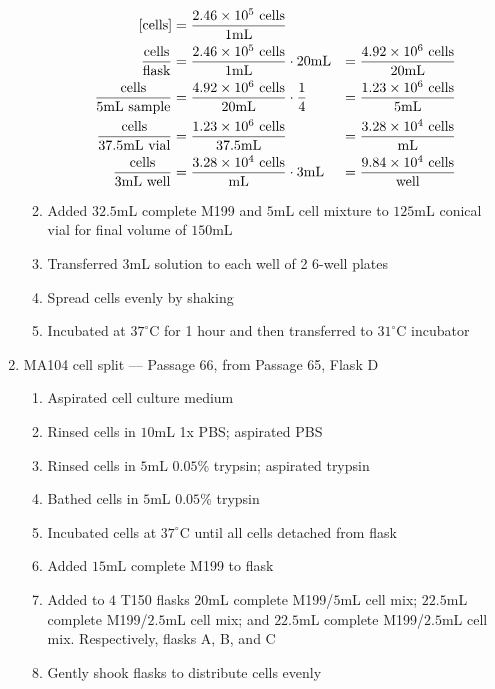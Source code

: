 \begin{enumerate}
\begin{enumerate}
				\begin{align*}
				\text{[cells]} &= \frac{2.46\times 10^{5}\text{ cells}}{1\text{mL}} \\
				\frac{\text{cells}}{\text{flask}} &= \frac{2.46\times 10^{5}\text{ cells}}{1\text{mL}} \cdot 20\text{mL} &= \frac{4.92\times 10^{6}\text{ cells}}{20\text{mL}}\\
				\frac{\text{cells}}{5\text{mL sample}} &= \frac{4.92\times 10^{6}\text{ cells}}{20\text{mL}}\cdot \frac{1}{4} &= \frac{1.23\times 10^{6}\text{ cells}}{5\text{mL}}\\
				\frac{\text{cells}}{37.5\text{mL vial}} &= \frac{1.23\times 10^{6}\text{ cells}}{37.5\text{mL}} &= \frac{3.28\times 10^{4}\text{ cells}}{\text{mL}}\\
				\frac{\text{cells}}{3\text{mL well}} &= \frac{3.28\times 10^{4}\text{ cells}}{\text{mL}} \cdot 3\text{mL} &= \frac{9.84\times 10^{4}\text{ cells}}{\text{well}}\\
				\end{align*}
			\item Added $32.5$mL complete M199 and $5$mL cell mixture to $125$mL conical vial for final volume of $150$mL
			\item Transferred $3$mL solution to each well of 2 6-well plates
			\item Spread cells evenly by shaking
			\item Incubated at $37^{\circ}$C for 1 hour and then transferred to $31^{\circ}$C incubator
		\end{enumerate}
	\item MA104 cell split --- Passage 66, from Passage 65, Flask D
		\begin{enumerate}
			\item Aspirated cell culture medium
			\item Rinsed cells in $10$mL 1x PBS; aspirated PBS
			\item Rinsed cells in $5$mL $0.05$\% trypsin; aspirated trypsin
			\item Bathed cells in $5$mL $0.05$\% trypsin
			\item Incubated cells at $37^{\circ}$C until all cells detached from flask
			\item Added $15$mL complete M199 to flask
			\item Added to $4$ T150 flasks $20$mL complete M199/$5$mL cell mix; $22.5$mL complete M199/$2.5$mL cell mix; and $22.5$mL complete M199/$2.5$mL cell mix. Respectively, flasks A, B, and C
			\item Gently shook flasks to distribute cells evenly

\end{enumerate}
\end{enumerate}
